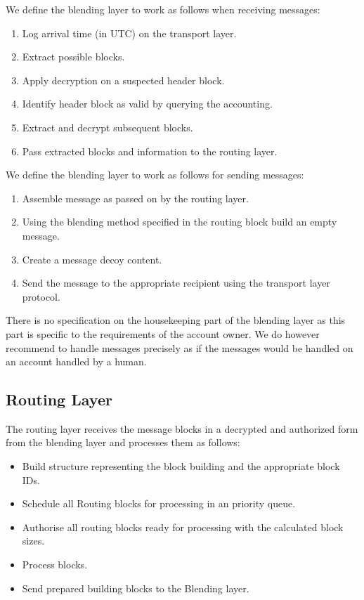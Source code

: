 We define the blending layer to work as follows when receiving messages:

\begin{enumerate}
	\item Log arrival time (in UTC) on the transport layer.
	\item Extract possible blocks.
	\item Apply decryption on a suspected header block.
	\item Identify header block as valid by querying the accounting.
	\item Extract and decrypt subsequent blocks.
	\item Pass extracted blocks and information to the routing layer.
\end{enumerate}

We define the blending layer to work as follows for sending messages:

\begin{enumerate}
	\item Assemble message as passed on by the routing layer.
	\item Using the blending method specified in the routing block build an empty message. 
	\item Create a message decoy content.
	\item Send the message to the appropriate recipient using the transport layer protocol.
\end{enumerate}

There is no specification on the housekeeping part of the blending layer as this part is specific to the requirements of the account owner. We do however recommend to handle messages precisely as if the messages would be handled on an account handled by a human. 

\subsection{Routing Layer}
The routing layer receives the message blocks in a decrypted and authorized form from the blending layer and processes them as follows:

\begin{itemize}
	\item Build structure representing the block building and the appropriate block IDs.
	\item Schedule all Routing blocks for processing in an priority queue.
	\item Authorise all routing blocks ready for processing with the calculated block sizes.
	\item Process blocks.
	\item Send prepared building blocks to the Blending layer.
\end{itemize}

